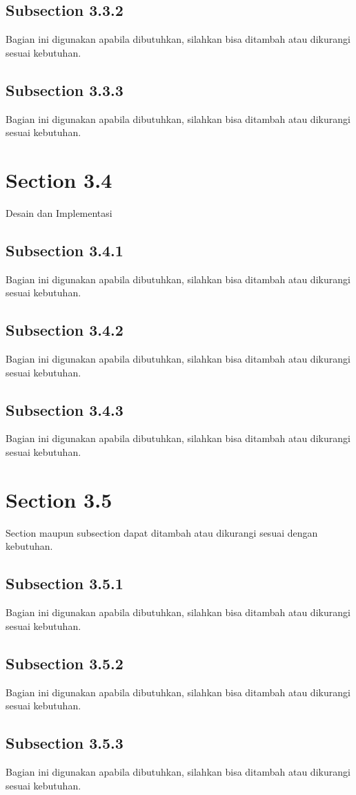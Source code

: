 \subsection{Subsection 3.3.2}
Bagian ini digunakan apabila dibutuhkan, silahkan bisa ditambah atau dikurangi sesuai kebutuhan.

\subsection{Subsection 3.3.3}
Bagian ini digunakan apabila dibutuhkan, silahkan bisa ditambah atau dikurangi sesuai kebutuhan.

\section{Section 3.4}
Desain dan Implementasi

\subsection{Subsection 3.4.1}
Bagian ini digunakan apabila dibutuhkan, silahkan bisa ditambah atau dikurangi sesuai kebutuhan.

\subsection{Subsection 3.4.2}
Bagian ini digunakan apabila dibutuhkan, silahkan bisa ditambah atau dikurangi sesuai kebutuhan.

\subsection{Subsection 3.4.3}
Bagian ini digunakan apabila dibutuhkan, silahkan bisa ditambah atau dikurangi sesuai kebutuhan.

\section{Section 3.5}
Section maupun subsection dapat ditambah atau dikurangi sesuai dengan kebutuhan.

\subsection{Subsection 3.5.1}
Bagian ini digunakan apabila dibutuhkan, silahkan bisa ditambah atau dikurangi sesuai kebutuhan.

\subsection{Subsection 3.5.2}
Bagian ini digunakan apabila dibutuhkan, silahkan bisa ditambah atau dikurangi sesuai kebutuhan.

\subsection{Subsection 3.5.3}
Bagian ini digunakan apabila dibutuhkan, silahkan bisa ditambah atau dikurangi sesuai kebutuhan.